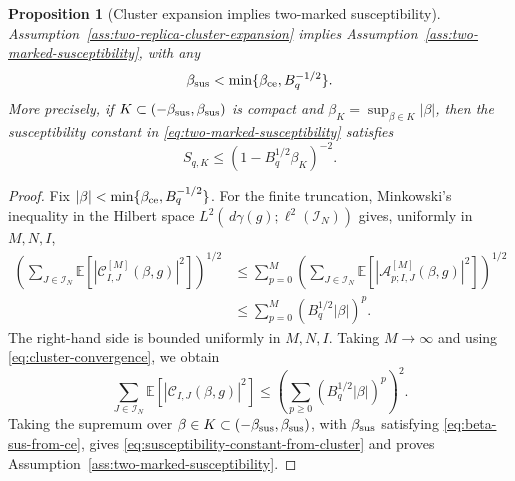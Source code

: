 \documentclass[11pt]{article}
\newtheorem{proposition}[theorem]{Proposition}
\newcommand{\E}{\mathbb{E}}
\newcommand{\calI}{\mathcal{I}}
\newcommand{\dd}{\,d}
\begin{document}
\begin{proposition}[Cluster expansion implies two-marked susceptibility]
  \label{prop:cluster-expansion-to-susceptibility}
  Assumption~\ref{ass:two-replica-cluster-expansion} implies
  Assumption~\ref{ass:two-marked-susceptibility}, with any
  \begin{equation}\label{eq:beta-sus-from-ce}
    \beta_{\rm sus}<\min\{\beta_{\rm ce},B_q^{-1/2}\}.
  \end{equation}
  More precisely, if $K\subset(-\beta_{\rm sus},\beta_{\rm sus})$ is compact
  and $\beta_K=\sup_{\beta\in K}|\beta|$, then the susceptibility constant in
  \eqref{eq:two-marked-susceptibility} satisfies
  \begin{equation}\label{eq:susceptibility-constant-from-cluster}
    S_{q,K}
    \leq
    \left(1-B_q^{1/2}\beta_K\right)^{-2}.
  \end{equation}
\end{proposition}

\begin{proof}
  Fix $|\beta|<\min\{\beta_{\rm ce},B_q^{-1/2}\}$.  For the finite truncation,
  Minkowski's inequality
  in the Hilbert space
  $L^2(\dd\gamma(g);\ell^2(\calI_N))$ gives, uniformly in $M,N,I$,
  \begin{align}\label{eq:cluster-to-susceptibility-proof}
    \left(
      \sum_{J\in\calI_N}
      \E\left[
        \left|
          \mathcal C^{[M]}_{I,J}(\beta,g)
        \right|^2
      \right]
    \right)^{1/2}
    &\leq
    \sum_{p=0}^M
    \left(
      \sum_{J\in\calI_N}
      \E\left[
        \left|
          \mathcal A^{[M]}_{p;I,J}(\beta,g)
        \right|^2
      \right]
    \right)^{1/2} \\
    &\leq
    \sum_{p=0}^M
    (B_q^{1/2}|\beta|)^p.
  \end{align}
  The right-hand side is bounded uniformly in $M,N,I$.  Taking $M\to\infty$
  and using \eqref{eq:cluster-convergence}, we obtain
  \begin{equation}\label{eq:susceptibility-from-cluster-limit}
    \sum_{J\in\calI_N}
    \E\left[
      \left|
        \mathcal C_{I,J}(\beta,g)
      \right|^2
    \right]
    \leq
    \left(
      \sum_{p\geq0}(B_q^{1/2}|\beta|)^p
    \right)^2.
  \end{equation}
  Taking the supremum over
  $\beta\in K\subset(-\beta_{\rm sus},\beta_{\rm sus})$, with
  $\beta_{\rm sus}$ satisfying \eqref{eq:beta-sus-from-ce}, gives
  \eqref{eq:susceptibility-constant-from-cluster} and proves
  Assumption~\ref{ass:two-marked-susceptibility}.
\end{proof}
\end{document}
